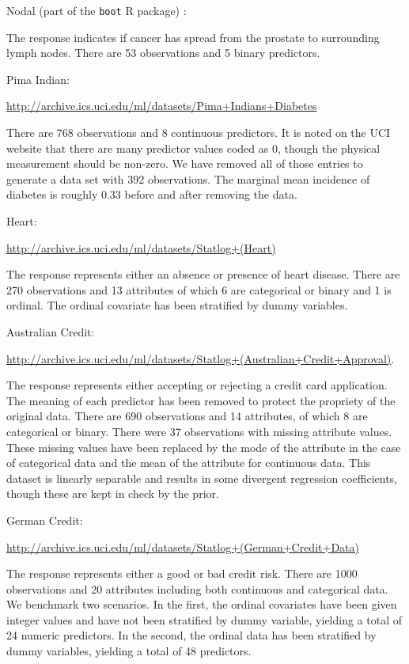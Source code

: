\documentclass{article}
\begin{document}
\begin{outline}

\1 Nodal (part of the \texttt{boot} R package) :

The response indicates if cancer has spread from the prostate to surrounding
lymph nodes.  There are 53 observations and 5 binary predictors.

\1 Pima Indian:

\url{http://archive.ics.uci.edu/ml/datasets/Pima+Indians+Diabetes}

There are 768 observations and 8 continuous predictors.  It is noted on the UCI
website that there are many predictor values coded as 0, though the physical
measurement should be non-zero.  We have removed all of those entries to
generate a data set with 392 observations.  The marginal mean incidence of
diabetes is roughly 0.33 before and after removing the data.

\1 Heart:

\url{http://archive.ics.uci.edu/ml/datasets/Statlog+(Heart)}

The response represents either an absence or presence of heart disease.  There
are 270 observations and 13 attributes of which 6 are categorical or binary and
1 is ordinal.  The ordinal covariate has been stratified by dummy variables.

\1 Australian Credit: 

\url{http://archive.ics.uci.edu/ml/datasets/Statlog+(Australian+Credit+Approval)}.

The response represents either accepting or rejecting a credit card application.
The meaning of each predictor has been removed to protect the propriety of the
original data.  There are 690 observations and 14 attributes, of which 8 are
categorical or binary.  There were 37 observations with missing attribute
values.  These missing values have been replaced by the mode of the attribute in
the case of categorical data and the mean of the attribute for continuous data.
This dataset is linearly separable and results in some divergent regression
coefficients, though these are kept in check by the prior.

\1 German Credit: 

\url{http://archive.ics.uci.edu/ml/datasets/Statlog+(German+Credit+Data)}

The response represents either a good or bad credit risk.  There are 1000
observations and 20 attributes including both continuous and categorical data.
We benchmark two scenarios.  In the first, the ordinal covariates have been
given integer values and have not been stratified by dummy variable, yielding a
total of 24 numeric predictors.  In the second, the ordinal data has been
stratified by dummy variables, yielding a total of 48 predictors.

\end{outline}
\end{document}
